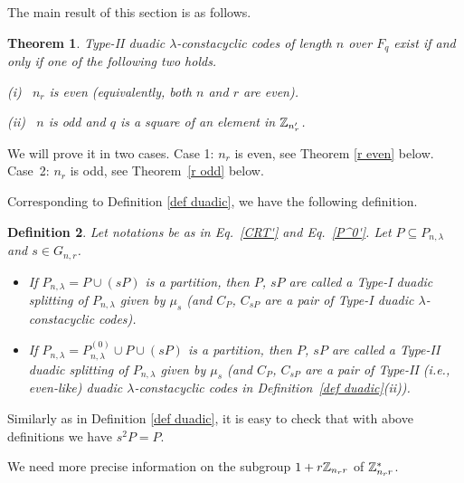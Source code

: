 \documentclass{article}
\newtheorem{Theorem}{Theorem}[section]
\newtheorem{Definition}[Theorem]{Definition}
\numberwithin{equation}{section}
\numberwithin{table}{section}
\def\Z{{\Bbb Z}}
\begin{document}
The main result of this section is as follows.


\begin{Theorem}\label{existence}
Type-II duadic $\lambda$-constacyclic codes of length $n$ over $F_q$
exist if and only if one of the following two holds.

(i)~ $n_r$ is even (equivalently, both $n$ and $r$ are even).\nopagebreak

(ii)~ $n$ is odd and $q$ is a square of an element in $\Z_{n_r'}$.
\end{Theorem}

We will prove it in two cases. Case 1: $n_r$ is even, see Theorem \ref{r even} below.
Case~2: $n_r$ is odd, see Theorem~\ref{r odd} below.


Corresponding to Definition \ref{def duadic}, we have the following definition.

\begin{Definition}\label{def type ii}\rm
Let notations be as in Eq.~\eqref{CRT'} and Eq.~\eqref{P^0'}.
Let $P\subseteq P_{n,\lambda}$ and $s\in G_{n,r}$.
\begin{itemize}
\item[(i)]
If $P_{n,\lambda}=P\cup(sP)$ is a partition,
then $P$, $sP$ are called a {\em Type-I duadic splitting} of $P_{n,\lambda}$
given by $\mu_s$ (and
$C_P$, $C_{sP}$ are a pair of Type-I duadic $\lambda$-constacyclic codes).
\item[(ii)]
If $P_{n,\lambda}=P_{n,\lambda}^{(0)}\cup P\cup(sP)$
is a partition,
then $P$, $sP$ are called a {\em Type-II duadic splitting} of $P_{n,\lambda}$
given by $\mu_s$ (and  $C_P$, $C_{sP}$ are a pair of
Type-II (i.e., even-like) duadic $\lambda$-constacyclic codes in
Definition~\ref{def duadic}(ii)).
\end{itemize}
\end{Definition}

Similarly as in Definition \ref{def duadic},
it is easy to check that with above definitions we have $s^2 P=P$.

We need more precise information on the subgroup $1+r\Z_{n_r r}$ of $\Z_{n_r r}^*$.
\end{document}
